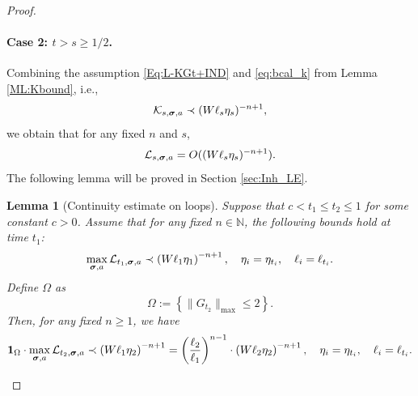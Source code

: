 \documentclass[10pt,reqno]{article}
\theoremstyle{plain} %
\newtheorem{lemma}[theorem]{Lemma}
\theoremstyle{remark}
\numberwithin{equation}{section}
\begin{document}
\begin{proof}
\paragraph{Case 2: \(t > s \geq 1/2\).} 
Combining the assumption \eqref{Eq:L-KGt+IND} and \eqref{eq:bcal_k} from Lemma \ref{ML:Kbound}, i.e., 
$$
{\cal K}_{s, \boldsymbol{\sigma}, \textbf{a}} \prec (W\ell_s\eta_s)^{-n+1}, 
$$
we obtain that for any fixed \(n\) and \(s\), 
\begin{equation}\label{Lboundfors}
    {\cal L}_{s, \boldsymbol{\sigma}, \textbf{a}} = O((W\ell_s\eta_s)^{-n+1}).
\end{equation}
The following lemma will be proved in Section \ref{sec:Inh_LE}.



\begin{lemma}[Continuity  estimate on loops]\label{lem_ConArg}
Suppose that \(c < t_1 \leq t_2 \leq 1\) for some constant \(c > 0\). Assume that for any fixed \(n \in \mathbb{N}\), the following bounds hold at time \(t_1\): 
\begin{equation}\label{55}
    \max_{\boldsymbol{\sigma}, \textbf{a}} {\cal L}_{t_1, \boldsymbol{\sigma}, \textbf{a}} \prec \left( W \ell_1 \eta_1 \right)^{-n+1}, \quad \eta_i = \eta_{t_i}, \quad \ell_i = \ell_{t_i}.
\end{equation}
Define \(\Omega\) as 
\begin{equation}\label{usuayzoo}
    \Omega := \left\{\|G_{t_2}\|_{\max} \leq 2\right\}.
\end{equation}
Then, for any fixed \(n \geq 1\), we have
\begin{equation}\label{res_lo_bo_eta}
    {\bf 1}_\Omega \cdot \max_{\boldsymbol{\sigma}, \textbf{a}} {\cal L}_{t_2, \boldsymbol{\sigma}, \textbf{a}} \prec \left( W \ell_1 \eta_2 \right)^{-n+1} = \left( \frac{\ell_2}{\ell_1} \right)^{n-1} \cdot \left( W \ell_2 \eta_2 \right)^{-n+1}, \quad \eta_i = \eta_{t_i}, \quad \ell_i = \ell_{t_i}.
\end{equation}
\end{lemma}


\end{proof}
\end{document}
